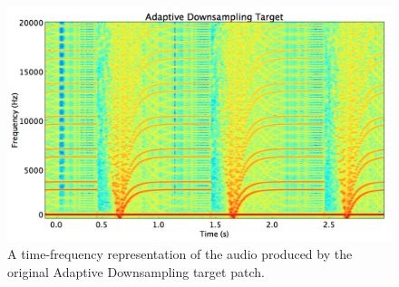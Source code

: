\documentclass[12pt]{report} 	%
\numberwithin{figure}{chapter}
\numberwithin{table}{chapter}
\numberwithin{equation}{chapter}
\begin{document}
\begin{flushleft}
\begin{figure}[h!]
\begin{center}
\includegraphics[scale=0.35,width=\linewidth]{AdaptiveDownsamplingTargetSTFT}
\caption[Original adaptive downsampling time-frequency representation]{A time-frequency representation of the audio produced by the original Adaptive Downsampling target patch.}
\end{center}
\end{figure}


\end{flushleft}
\end{document}

